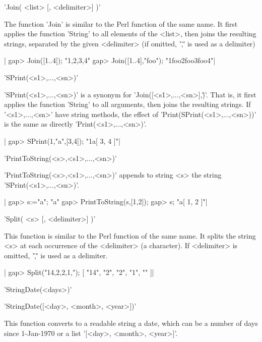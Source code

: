 %

'Join( <list> [, <delimiter>] )'

The  function 'Join' is similar  to the Perl function  of the same name. It
first  applies the  function 'String'  to all  elements of the <list>, then
joins  the  resulting  strings,  separated  by  the  given  <delimiter> (if
omitted, '\",\"' is used as a delimiter)

|   gap> Join([1..4]);
   "1,2,3,4"
   gap> Join([1..4],"foo");
   "1foo2foo3foo4"|

%

'SPrint(<s1>,...,<sn>)'

'SPrint(<s1>,...,<sn>)' is a synonym for 'Join([<s1>,...,<sn>],\"\")'. That
is, it first applies the function 'String' to all arguments, then joins the
resulting  strings. If '<s1>,...,<sn>'  have string methods,  the effect of
'Print(SPrint(<s1>,...,<sn>))' is the same as directly
'Print(<s1>,...,<sn>)'.

|   gap> SPrint(1,"a",[3,4]);
   "1a[ 3, 4 ]"|

%

'PrintToString(<s>,<s1>,...,<sn>)'

'PrintToString(<s>,<s1>,...,<sn>)'   appends  to  string   <s>  the  string
'SPrint(<s1>,...,<sn>)'.

|   gap> s:="a";
   "a"
   gap> PrintToString(s,[1,2]);
   gap> s;
   "a[ 1, 2 ]"|

%

'Split( <s> [, <delimiter>] )'

This function is similar to the Perl function of the same name. It splits
the string <s> at each occurrence of the <delimiter> (a character).
If <delimiter> is omitted, '\',\'' is used as a delimiter.

|   gap> Split("14,2,2,1,");
    [ "14", "2", "2", "1", "" ]|

%

'StringDate(<days>)'

'StringDate([<day>, <month>, <year>])'

This  function converts to a readable string  a date, which can be a number
of days since 1-Jan-1970 or a list '[<day>, <month>, <year>]'.

